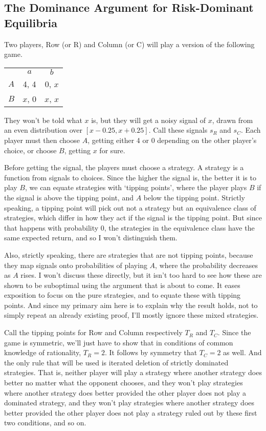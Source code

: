 \documentclass[11pt,]{book}
\def\toprule{}
\def\bottomrule{}
\begin{document}
\hypertarget{cvdproof}{%
\subsection{The Dominance Argument for Risk-Dominant Equilibria}\label{cvdproof}}

Two players, Row (or R) and Column (or C) will play a version of the following game.

\begin{longtable}[]{@{}lcc@{}}
\toprule
\endhead
& \(a\) & \(b\)\tabularnewline
\(A\) & 4, 4 & 0, \(x\)\tabularnewline
\(B\) & \(x\), 0 & \(x\), \(x\)\tabularnewline
\bottomrule
\end{longtable}

They won't be told what \(x\) is, but they will get a noisy signal of \(x\), drawn from an even distribution over \([x - 0.25, x + 0.25]\). Call these signals \(s_R\) and \(s_C\). Each player must then choose \(A\), getting either 4 or 0 depending on the other player's choice, or choose \(B\), getting \(x\) for sure.

Before getting the signal, the players must choose a strategy. A strategy is a function from signals to choices. Since the higher the signal is, the better it is to play \(B\), we can equate strategies with `tipping points', where the player plays \(B\) if the signal is above the tipping point, and \(A\) below the tipping point. Strictly speaking, a tipping point will pick out not a strategy but an equivalence class of strategies, which differ in how they act if the signal is the tipping point. But since that happens with probability 0, the strategies in the equivalence class have the same expected return, and so I won't distinguish them.

Also, strictly speaking, there are strategies that are not tipping points, because they map signals onto probabilities of playing \(A\), where the probability decreases as \(A\) rises. I won't discuss these directly, but it isn't too hard to see how these are shown to be suboptimal using the argument that is about to come. It eases exposition to focus on the pure strategies, and to equate these with tipping points. And since my primary aim here is to explain why the result holds, not to simply repeat an already existing proof, I'll mostly ignore these mixed strategies.

Call the tipping points for Row and Column respectively \(T_R\) and \(T_C\). Since the game is symmetric, we'll just have to show that in conditions of common knowledge of rationality, \(T_R = 2\). It follows by symmetry that \(T_C = 2\) as well. And the only rule that will be used is iterated deletion of strictly dominated strategies. That is, neither player will play a strategy where another strategy does better no matter what the opponent chooses, and they won't play strategies where another strategy does better provided the other player does not play a dominated strategy, and they won't play strategies where another strategy does better provided the other player does not play a strategy ruled out by these first two conditions, and so on.
\end{document}
